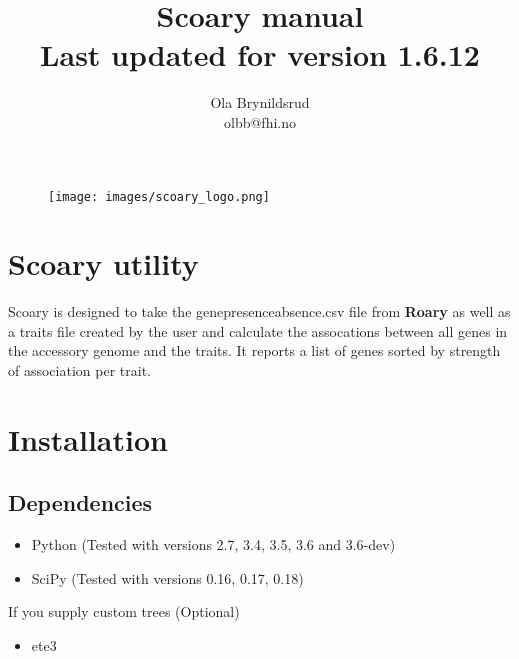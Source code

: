 \documentclass{article}
\title{Scoary manual\\Last updated for version 1.6.12}
\date{}
\author{Ola Brynildsrud\\olbb@fhi.no}
\begin{document}

  \maketitle

  \newpage

  \tableofcontents

  \newpage


  \begin{figure}
    \texttt{[image: images/scoary\_logo.png]}
  \end{figure}

  \section{Scoary utility}

  Scoary \cite{brynildsrud2016rapid} is designed to take the gene\textunderscore presence\textunderscore absence.csv file from \textbf{Roary} \cite{page2015roary} as well as a traits file created by the user and calculate the assocations between all genes in the accessory genome and the traits. It reports a list of genes sorted by strength of association per trait.

  \section{Installation}

    \subsection{Dependencies}

    \begin{itemize}

      \item Python (Tested with versions 2.7, 3.4, 3.5, 3.6 and 3.6-dev)
      \item SciPy (Tested with versions 0.16, 0.17, 0.18)

    \end{itemize}

    \noindent If you supply custom trees (Optional)

    \begin{itemize}

      \item ete3

    \end{itemize}
\end{document}
